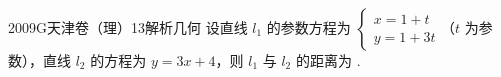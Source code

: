 
\begin{problem}{2009}{G}{天津卷（理）}{13}{解析几何}
设直线 $l_1$ 的参数方程为 $\begin{cases} x=1+t \\ y=1+3t \end{cases}$（$t$ 为参数），直线 $l_2$ 的方程为 $y=3x+4$，则 $l_1$ 与 $l_2$ 的距离为 \underline{\hspace{4em}}.
\end{problem}

\begin{answer}

\end{answer}

\begin{solutions}

\end{solutions}